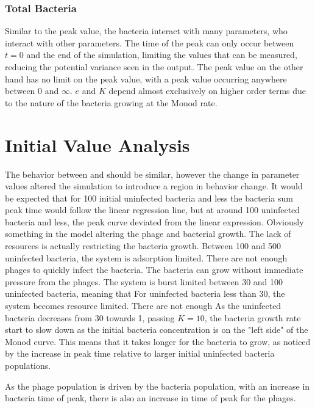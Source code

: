 \subsubsection{Total Bacteria}
Similar to the peak value, the bacteria interact with many parameters, who interact with other parameters. 
The time of the peak can only occur between $t=0$ and the end of the simulation, limiting the values that can be measured, reducing the potential variance seen in the output. 
The peak value on the other hand has no limit on the peak value, with a peak value occurring anywhere between 0 and $\infty$. 
$e$ and $K$ depend almost exclusively on higher order terms due to the nature of the bacteria growing at the Monod rate. 

\section{Initial Value Analysis}
The behavior between  and  should be similar, however the change in parameter values altered the simulation to introduce a region in behavior change. 
It would be expected that for 100 initial uninfected bacteria and less the bacteria sum peak time would follow the linear regression line, but at around 100 uninfected bacteria and less, the peak curve deviated from the linear expression. 
Obviously something in the model altering the phage and bacterial growth. 
The lack of resources is actually restricting the bacteria growth. 
Between 100 and 500 uninfected bacteria, the system is adsorption limited. 
There are not enough phages to quickly infect the bacteria. 
The bacteria can grow without immediate pressure from the phages. 
The system is burst limited between 30 and 100 uninfected bacteria, meaning that 
For uninfected bacteria less than 30, the system becomes resource limited. 
There are not enough
As the uninfected bacteria decreases from 30 towards 1, passing $K=10$, the bacteria growth rate start to slow down as the initial bacteria concentration is on the "left side" of the Monod curve. 
This means that it takes longer for the bacteria to grow, as noticed by the increase in peak time relative to larger initial uninfected bacteria populations. 

As the phage population is driven by the bacteria population, with an increase in bacteria time of peak, there is also an increase in time of peak for the phages. 


